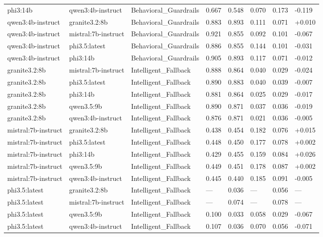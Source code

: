 \begin{table}
\begin{tabular}{llllllll}
phi3:14b & qwen3:4b-instruct & Behavioral_Guardrails & 0.667 & 0.548 & 0.070 & 0.173 & -0.119 \\
qwen3:4b-instruct & granite3.2:8b & Behavioral_Guardrails & 0.883 & 0.893 & 0.111 & 0.071 & +0.010 \\
qwen3:4b-instruct & mistral:7b-instruct & Behavioral_Guardrails & 0.921 & 0.855 & 0.092 & 0.101 & -0.067 \\
qwen3:4b-instruct & phi3.5:latest & Behavioral_Guardrails & 0.886 & 0.855 & 0.144 & 0.101 & -0.031 \\
qwen3:4b-instruct & phi3:14b & Behavioral_Guardrails & 0.905 & 0.893 & 0.117 & 0.071 & -0.012 \\
granite3.2:8b & mistral:7b-instruct & Intelligent_Fallback & 0.888 & 0.864 & 0.040 & 0.029 & -0.024 \\
granite3.2:8b & phi3.5:latest & Intelligent_Fallback & 0.890 & 0.883 & 0.040 & 0.039 & -0.007 \\
granite3.2:8b & phi3:14b & Intelligent_Fallback & 0.881 & 0.864 & 0.025 & 0.029 & -0.017 \\
granite3.2:8b & qwen3.5:9b & Intelligent_Fallback & 0.890 & 0.871 & 0.037 & 0.036 & -0.019 \\
granite3.2:8b & qwen3:4b-instruct & Intelligent_Fallback & 0.876 & 0.871 & 0.021 & 0.036 & -0.005 \\
mistral:7b-instruct & granite3.2:8b & Intelligent_Fallback & 0.438 & 0.454 & 0.182 & 0.076 & +0.015 \\
mistral:7b-instruct & phi3.5:latest & Intelligent_Fallback & 0.448 & 0.450 & 0.177 & 0.078 & +0.002 \\
mistral:7b-instruct & phi3:14b & Intelligent_Fallback & 0.429 & 0.455 & 0.159 & 0.084 & +0.026 \\
mistral:7b-instruct & qwen3.5:9b & Intelligent_Fallback & 0.449 & 0.451 & 0.178 & 0.087 & +0.002 \\
mistral:7b-instruct & qwen3:4b-instruct & Intelligent_Fallback & 0.445 & 0.440 & 0.185 & 0.091 & -0.005 \\
phi3.5:latest & granite3.2:8b & Intelligent_Fallback & --- & 0.036 & --- & 0.056 & --- \\
phi3.5:latest & mistral:7b-instruct & Intelligent_Fallback & --- & 0.074 & --- & 0.078 & --- \\
phi3.5:latest & qwen3.5:9b & Intelligent_Fallback & 0.100 & 0.033 & 0.058 & 0.029 & -0.067 \\
phi3.5:latest & qwen3:4b-instruct & Intelligent_Fallback & 0.107 & 0.036 & 0.070 & 0.056 & -0.071 \\

\end{tabular}
\end{table}
